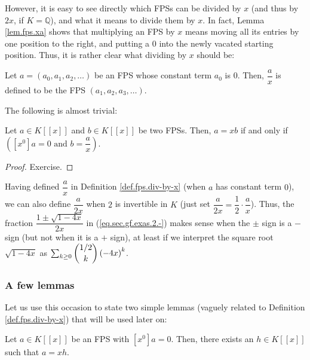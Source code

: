 However, it is easy to see directly which FPSs can be divided by $x$ (and thus
by $2x$, if $K=\mathbb{Q}$), and what it means to divide them by $x$. In fact,
Lemma \ref{lem.fps.xa} shows that multiplying an FPS by $x$ means moving all
its entries by one position to the right, and putting a $0$ into the newly
vacated starting position. Thus, it is rather clear what dividing by $x$
should be:

\begin{definition}
\label{def.fps.div-by-x}Let $a=\left(  a_{0},a_{1},a_{2},\ldots\right)  $ be
an FPS whose constant term $a_{0}$ is $0$. Then, $\dfrac{a}{x}$ is defined to
be the FPS $\left(  a_{1},a_{2},a_{3},\ldots\right)  $.
\end{definition}

The following is almost trivial:

\begin{proposition}
\label{prop.fps.div-by-x-inverts}Let $a\in K\left[  \left[  x\right]  \right]
$ and $b\in K\left[  \left[  x\right]  \right]  $ be two FPSs. Then, $a=xb$ if
and only if $\left(  \left[  x^{0}\right]  a=0\text{ and }b=\dfrac{a}%
{x}\right)  $.
\end{proposition}

\begin{proof}
Exercise.
\end{proof}

Having defined $\dfrac{a}{x}$ in Definition \ref{def.fps.div-by-x} (when $a$
has constant term $0$), we can also define $\dfrac{a}{2x}$ when $2$ is
invertible in $K$ (just set $\dfrac{a}{2x}=\dfrac{1}{2}\cdot\dfrac{a}{x}$).
Thus, the fraction $\dfrac{1\pm\sqrt{1-4x}}{2x}$ in (\ref{eq.sec.gf.exas.2.-})
makes sense when the $\pm$ sign is a $-$ sign (but not when it is a $+$ sign),
at least if we interpret the square root $\sqrt{1-4x}$ as $\sum_{k\geq
0}\dbinom{1/2}{k}\left(  -4x\right)  ^{k}$.

\subsubsection{A few lemmas}

Let us use this occasion to state two simple lemmas (vaguely related to
Definition \ref{def.fps.div-by-x}) that will be used later on:

\begin{lemma}
\label{lem.fps.g=xh}Let $a\in K\left[  \left[  x\right]  \right]  $ be an FPS
with $\left[  x^{0}\right]  a=0$. Then, there exists an $h\in K\left[  \left[
x\right]  \right]  $ such that $a=xh$.
\end{lemma}

